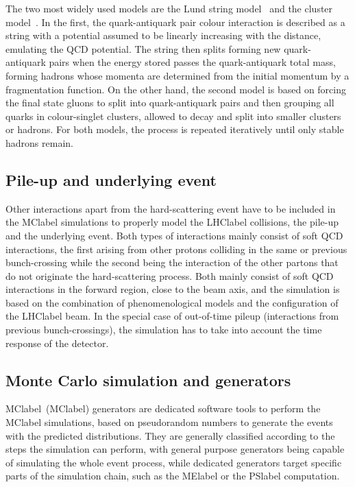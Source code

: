 The two most widely used models are the Lund string model~\cite{ANDERSSON198331} and the cluster model~\cite{Winter2004}.
In the first, the quark-antiquark pair colour interaction is described as a string with a potential assumed to be linearly increasing with the distance, emulating the \acrshort{QCD} potential. The string then splits forming new quark-antiquark pairs when the energy stored passes the quark-antiquark total mass, forming hadrons whose momenta are determined from the initial momentum by a fragmentation function. On the other hand, the second model is based on forcing the final state gluons to split into quark-antiquark pairs and then grouping all quarks in colour-singlet clusters, allowed to decay and split into smaller clusters or hadrons. For both models, the process is repeated iteratively until only stable hadrons remain.

\subsection{Pile-up and underlying event}

Other interactions apart from the hard-scattering event have to be included in the \acrshort{MClabel} simulations to properly model the \acrshort{LHClabel} collisions, the pile-up and the underlying event. Both types of interactions mainly consist of soft \acrshort{QCD} interactions, the first arising from other protons colliding in the same or previous bunch-crossing while the second being the interaction of the other partons that do not originate the hard-scattering process. Both mainly consist of soft \acrshort{QCD} interactions in the forward region, close to the beam axis, and the simulation is based on the combination of phenomenological models and the configuration of the \acrshort{LHClabel} beam. In the special case of out-of-time pileup (interactions from previous bunch-crossings), the simulation has to take into account the time response of the detector.

\subsection{Monte Carlo simulation and generators}
\label{subsec:MCsimulation}
\acrlong{MClabel}~(\acrshort{MClabel}) generators are dedicated software tools to perform the \acrshort{MClabel} simulations, based on pseudorandom numbers to generate the events with the predicted distributions. They are generally classified according to the steps the simulation can perform, with general purpose generators being capable of simulating the whole event process, while dedicated generators target specific parts of the simulation chain, such as the \acrshort{MElabel} or the \acrshort{PSlabel} computation.\\


